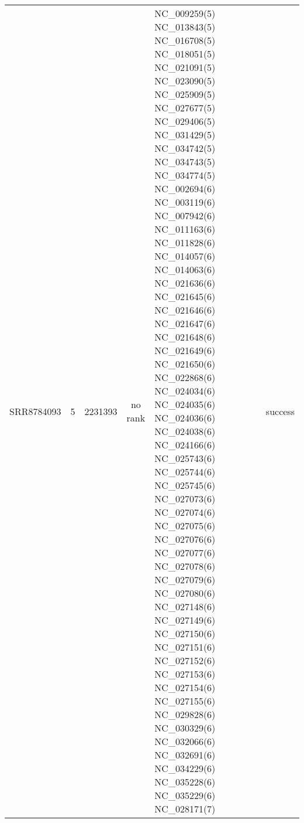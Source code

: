 \documentclass[oneside,10pt,A4]{scrartcl}
\begin{document}
\begin{landscape}
\begin{longtable}{lcccp{7cm}c}
SRR8784093 & 5 & 2231393 & no rank & NC\_009259(5) NC\_013843(5) NC\_016708(5) NC\_018051(5) NC\_021091(5) NC\_023090(5) NC\_025909(5) NC\_027677(5) NC\_029406(5) NC\_031429(5) NC\_034742(5) NC\_034743(5) NC\_034774(5) NC\_002694(6) NC\_003119(6) NC\_007942(6) NC\_011163(6) NC\_011828(6) NC\_014057(6) NC\_014063(6) NC\_021636(6) NC\_021645(6) NC\_021646(6) NC\_021647(6) NC\_021648(6) NC\_021649(6) NC\_021650(6) NC\_022868(6) NC\_024034(6) NC\_024035(6) NC\_024036(6) NC\_024038(6) NC\_024166(6) NC\_025743(6) NC\_025744(6) NC\_025745(6) NC\_027073(6) NC\_027074(6) NC\_027075(6) NC\_027076(6) NC\_027077(6) NC\_027078(6) NC\_027079(6) NC\_027080(6) NC\_027148(6) NC\_027149(6) NC\_027150(6) NC\_027151(6) NC\_027152(6) NC\_027153(6) NC\_027154(6) NC\_027155(6) NC\_029828(6) NC\_030329(6) NC\_032066(6) NC\_032691(6) NC\_034229(6) NC\_035228(6) NC\_035229(6) NC\_028171(7) & success \\
\end{longtable}
\end{landscape}
\end{document}
